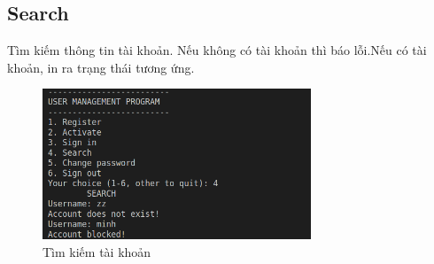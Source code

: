 \documentclass[12pt]{article}
\begin{document}
\subsection{Search}
Tìm kiếm thông tin tài khoản. Nếu không có tài khoản thì báo lỗi.Nếu có tài khoản, in ra trạng thái tương ứng.
\begin{figure}[!htb]
    \begin{center}
        \includegraphics[width=0.8\linewidth, height=4.5cm]{Img/4.png}
    \end{center}
    \caption{Tìm kiếm tài khoản}
    \label{fig:4_filethanhcong}
\end{figure}
\end{document}
